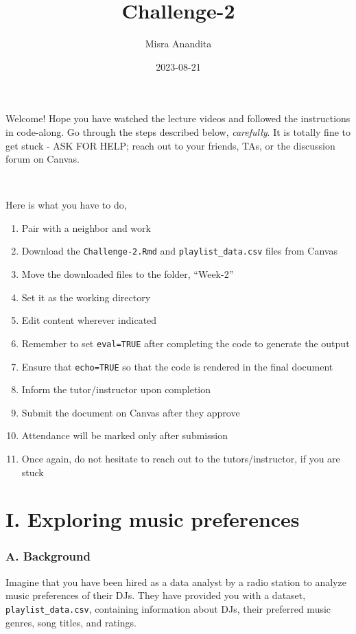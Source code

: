 \documentclass[
]{article}
\title{Challenge-2}
\author{Misra Anandita}
\date{2023-08-21}
\begin{document}
\maketitle

Welcome! Hope you have watched the lecture videos and followed the
instructions in code-along. Go through the steps described below,
\emph{carefully}. It is totally fine to get stuck - ASK FOR HELP; reach
out to your friends, TAs, or the discussion forum on Canvas.

~

Here is what you have to do,

\begin{enumerate}
\def\labelenumi{\arabic{enumi}.}
\item
  Pair with a neighbor and work
\item
  Download the \texttt{Challenge-2.Rmd} and \texttt{playlist\_data.csv}
  files from Canvas
\item
  Move the downloaded files to the folder, ``Week-2''
\item
  Set it as the working directory
\item
  Edit content wherever indicated
\item
  Remember to set \texttt{eval=TRUE} after completing the code to
  generate the output
\item
  Ensure that \texttt{echo=TRUE} so that the code is rendered in the
  final document
\item
  Inform the tutor/instructor upon completion
\item
  Submit the document on Canvas after they approve
\item
  Attendance will be marked only after submission
\item
  Once again, do not hesitate to reach out to the tutors/instructor, if
  you are stuck
\end{enumerate}

\hypertarget{i.-exploring-music-preferences}{%
\section{I. Exploring music
preferences}\label{i.-exploring-music-preferences}}

\hypertarget{a.-background}{%
\subsubsection{A. Background}\label{a.-background}}

Imagine that you have been hired as a data analyst by a radio station to
analyze music preferences of their DJs. They have provided you with a
dataset, \texttt{playlist\_data.csv}, containing information about DJs,
their preferred music genres, song titles, and ratings.
\end{document}
